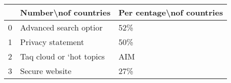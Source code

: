 \begin{tabular}{lll}
\toprule
{} &      Number\textbackslash nof countries & Per centage\textbackslash nof countries \\
\midrule
0 &    Advanced search optior &                       52\% \\
1 &         Privacy statement &                       50\% \\
2 &  Taq cloud or ‘hot topics &                       AIM \\
3 &            Secure website &                       27\% \\
\bottomrule
\end{tabular}
